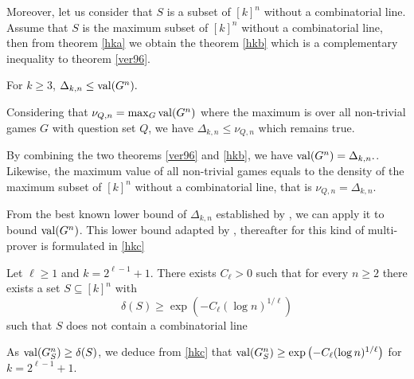 Moreover, let us consider that $S$ is a subset of $[k]^n$ without a combinatorial line. Assume that $S$ is the maximum subset of $[k]^n$ without a combinatorial line, then from theorem \eqref{hka} we obtain the theorem \eqref{hkb} which is a  complementary inequality to theorem \eqref{ver96}.
 
 \begin{thm} For $k \geq 3$, $\Delta_{k,n}	\leq \mathrm{val} (G^n).$ \label{hkb}	\end{thm}
 
 Considering that $\nu_{Q,n}=\max_G \mathrm{val} (G^n)$ where the maximum is over all non-trivial games $G$ with question set $Q$, we have $\Delta_{k,n}	\leq \nu_{Q,n}$ which remains true.
 
 By combining the two theorems \eqref{ver96} and \eqref{hkb}, we have $\mathrm{val} (G^n)=\Delta_{k,n}.$. Likewise, the maximum  value of  all non-trivial games equals to the density of the maximum subset of $[k]^n$ without a combinatorial line, that is $\nu_{Q,n}=\Delta_{k,n}.$
 
From the best known lower bound of $\Delta_{k,n}$ established by \cite{polymath2010density}, we can apply it to bound $\mathrm{val} (G^n)$. This lower bound adapted by \cite{hkazla2016forbidden}, thereafter for this kind of multi-prover is formulated in \eqref{hkc}
 
 \begin{thm}Let $\ell \geq 1$ and $k=2^{\ell-1}+1.$ There exists $C_{\ell} >0$ such that for every $n\geq 2$ there exists a set $S \subseteq [k]^n$ with $$ \delta(S) \geq \exp \left( -C_{\ell} (\log n)^{1/\ell} \right)$$	 such that $S$ does not contain a combinatorial line  \label{hkc}	\end{thm}

 As $\mathrm{val} (G_S^n) \geq  \delta(S)$, we deduce from \eqref{hkc} that  $\mathrm{val} (G_S^n) \geq  \exp \left( -C_{\ell} (\log n)^{1/\ell} \right)$ for $k=2^{\ell-1}+1.$

 